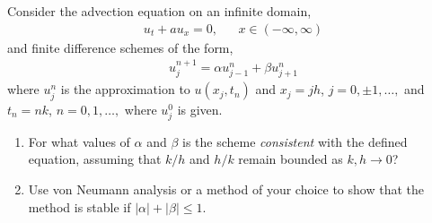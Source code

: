 \documentclass[10pt]{article}
\begin{document}
\begin{problem}
Consider the advection equation on an infinite domain,
\begin{align*}
    u_t + a u_x =0, && x\in(-\infty,\infty)
\end{align*}
and finite difference schemes of the form,
\begin{align*}
    u_j^{n+1} = \alpha u_{j-1}^n + \beta u_{j+1}^n
\end{align*}
    where \( u_j^n \) is the approximation to \( u(x_j,t_n) \) and \( x_j = jh \), \( j=0,\pm 1, \ldots, \) and \( t_n = nk \), \( n=0,1,\ldots,  \) where \( u_j^0 \) is given.
\begin{enumerate}[label=(\alph*), nolistsep]
    \item For what values of \( \alpha \) and \( \beta \) is the scheme \textit{consistent} with the defined equation, assuming that \( k/h \) and \( h/k \) remain bounded as \( k,h\to 0 \)?
    \item Use von Neumann analysis or a method of your choice to show that the method is stable if \( |\alpha| + |\beta| \leq 1 \).
    
\end{enumerate}
\end{problem}
\end{document}

